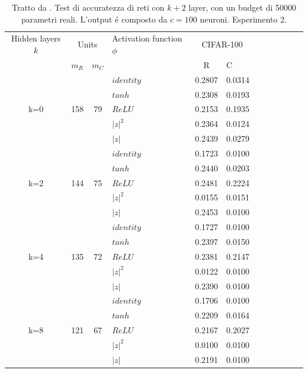 \documentclass[a4paper,12pt]{report}
\begin{document}
 \begin{table}
  \centering
  \begin{tabular}{cp{} cp{} cp{}   cp{} cp{} cp{}}
   \cline{1-6}
   Hidden layers $k$ & \multicolumn{2}{c}{Units} $p_R$ & Activation function $\phi$ & \multicolumn{2}{c}{CIFAR-100}\\
   \cline{2-3} \cline{5-6}
   & $m_R$ & $m_C$ & & R & C \\
   \cline{1-6}
   & & & $identity$ & 0.2807 & 0.0314 \\
   \cline{4-6}
   & & & $tanh$ & 0.2308 & 0.0193 \\
   \cline{4-6}
   k=0 & 158 & 79 & $ReLU$ & 0.2153 & 0.1935 \\
   \cline{4-6}
   & & & $|z|^2$ & 0.2364 & 0.0124 \\
   \cline{4-6}
   & & & $|z|$ & 0.2439 & 0.0279 \\
   \cline{1-6}
   
   \cline{1-6}
   & & & $identity$ & 0.1723 & 0.0100 \\
   \cline{4-6}
   & & & $tanh$ & 0.2440 & 0.0203 \\
   \cline{4-6}
   k=2 & 144 & 75 & $ReLU$ & 0.2481 & 0.2224 \\
   \cline{4-6}
   & & & $|z|^2$ & 0.0155 & 0.0151 \\
   \cline{4-6}
   & & & $|z|$ & 0.2453 & 0.0100 \\
   \cline{1-6}
   
   \cline{1-6}
   & & & $identity$ & 0.1727 & 0.0100 \\
   \cline{4-6}
   & & & $tanh$ & 0.2397 & 0.0150 \\
   \cline{4-6}
   k=4 & 135 & 72 & $ReLU$ & 0.2381 & 0.2147 \\
   \cline{4-6}
   & & & $|z|^2$ & 0.0122 & 0.0100 \\
   \cline{4-6}
   & & & $|z|$ & 0.2390 & 0.0100 \\
   \cline{1-6}
   
   \cline{1-6}
   & & & $identity$ & 0.1706 & 0.0100 \\
   \cline{4-6}
   & & & $tanh$ & 0.2209 & 0.0164 \\
   \cline{4-6}
   k=8 & 121 & 67 & $ReLU$ & 0.2167 & 0.2027 \\
   \cline{4-6}
   & & & $|z|^2$ & 0.0100 & 0.0100 \\
   \cline{4-6}
   & & & $|z|$ & 0.2191 & 0.0100 \\
   \cline{1-6}
      
  \end{tabular}
  \caption{Tratto da \cite{monning2018evaluation}. Test di accuratezza di reti con $k+2$ layer, con un budget di 50000 parametri reali. L'output \'e composto da $c=100$ neuroni. Esperimento 2.}
  \label{CIFAR-1002Tab}
 \end{table}
 
\end{document}
